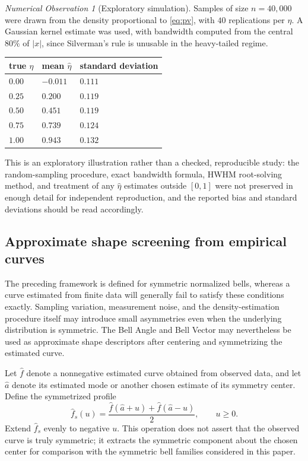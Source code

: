 \documentclass[11pt]{article}
\theoremstyle{definition}
\theoremstyle{plain}
\theoremstyle{remark}
\newtheorem{observation}[definition]{Numerical Observation}
\begin{document}
\begin{observation}[Exploratory simulation]\label{obs:sim}
Samples of size $n=40{,}000$ were drawn from the density proportional to \eqref{eq:pv},
with $40$ replications per $\eta$. A Gaussian kernel estimate was used, with bandwidth
computed from the central $80\%$ of $|x|$, since Silverman's rule is unusable in the
heavy-tailed regime.
\begin{center}
\begin{tabular}{@{}lll@{}}
\toprule
true $\eta$ & mean $\hat\eta$ & standard deviation\\
\midrule
$0.00$ & $-0.011$ & $0.111$\\
$0.25$ & $0.200$  & $0.119$\\
$0.50$ & $0.451$  & $0.119$\\
$0.75$ & $0.739$  & $0.124$\\
$1.00$ & $0.943$  & $0.132$\\
\bottomrule
\end{tabular}
\end{center}
This is an exploratory illustration rather than a checked, reproducible study: the
random-sampling procedure, exact bandwidth formula, HWHM root-solving method, and
treatment of any $\hat\eta$ estimates outside $[0,1]$ were not preserved in enough
detail for independent reproduction, and the reported bias and standard deviations
should be read accordingly.
\end{observation}
\subsection{Approximate shape screening from empirical curves}
\label{sec:empiricalscreening}

The preceding framework is defined for symmetric normalized bells, whereas a curve
estimated from finite data will generally fail to satisfy these conditions exactly.
Sampling variation, measurement noise, and the density-estimation procedure itself may
introduce small asymmetries even when the underlying distribution is symmetric. The
Bell Angle and Bell Vector may nevertheless be used as approximate shape descriptors
after centering and symmetrizing the estimated curve.

Let $\widehat f$ denote a nonnegative estimated curve obtained from observed data, and
let $\widehat a$ denote its estimated mode or another chosen estimate of its symmetry
center. Define the symmetrized profile
\[
\widehat f_s(u)
=
\frac{
\widehat f(\widehat a+u)
+
\widehat f(\widehat a-u)
}{2},
\qquad
u\ge0.
\]
Extend $\widehat f_s$ evenly to negative $u$. This operation does not assert that the
observed curve is truly symmetric; it extracts the symmetric component about the chosen
center for comparison with the symmetric bell families considered in this paper.
\end{document}
